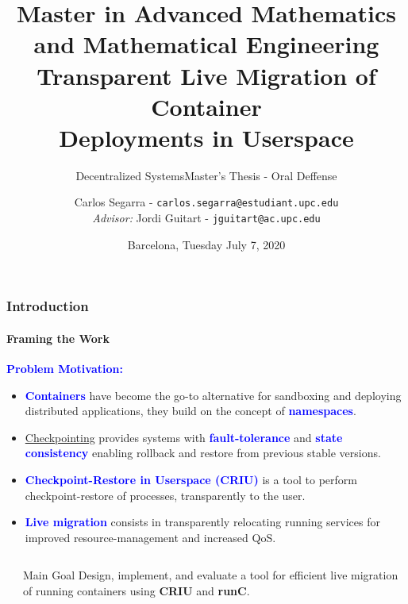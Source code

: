 \documentclass[9pt,    %
    english,            %
    xcolor=table,       %
    envcountsect,        %
    aspectratio=169     %
]{beamer}
\subtitle{Decentralized Systems} %
\title[Live Migration of Containers] %
    {\normalsize Master in Advanced Mathematics and Mathematical Engineering \\[5pt] \Large Transparent Live Migration of Container \\ \Large Deployments in Userspace}
\subtitle{Master's Thesis - Oral Deffense} %
\date[July 7, 2020] %
    {Barcelona, Tuesday July 7, 2020}
\author[] %
{Carlos Segarra - \texttt{carlos.segarra@estudiant.upc.edu} \\ \textit{Advisor:} Jordi Guitart - \texttt{jguitart@ac.upc.edu}}
\begin{document}

\begin{frame}
  \titlepage
\end{frame}

\begin{frame}
    \frametitle{Introduction}
    \framesubtitle{Framing the Work}

    \textbf{\textcolor{blue}{Problem Motivation:}}
    \begin{itemize}
        \item \textbf{\textcolor{blue}{Containers}} have become the go-to alternative for sandboxing and deploying distributed applications, they build on the concept of \textbf{\textcolor{blue}{namespaces}}.
        \item \href{https://en.wikipedia.org/wiki/Application_checkpointing}{Checkpointing} provides systems with \textbf{\textcolor{blue}{fault-tolerance}} and \textbf{\textcolor{blue}{state consistency}} enabling rollback and restore from previous stable versions.
        \item \textbf{\textcolor{blue}{Checkpoint-Restore in Userspace (CRIU)}} is a tool to perform checkpoint-restore of processes, transparently to the user.
        \item \textbf{\textcolor{blue}{Live migration}} consists in transparently relocating running services for improved resource-management and increased QoS.
    \end{itemize}

    \begin{columns}
        \begin{column}{.1\textwidth}
        \end{column}\hspace{-5cm}
        \begin{column}{.7\textwidth}
            \begin{alertblock}{Main Goal}
                Design, implement, and evaluate a tool for efficient live migration of running containers using \textbf{CRIU} and \textbf{runC}.
            \end{alertblock}\hfill
        \end{column}
    \end{columns}

\end{frame}
\end{document}
